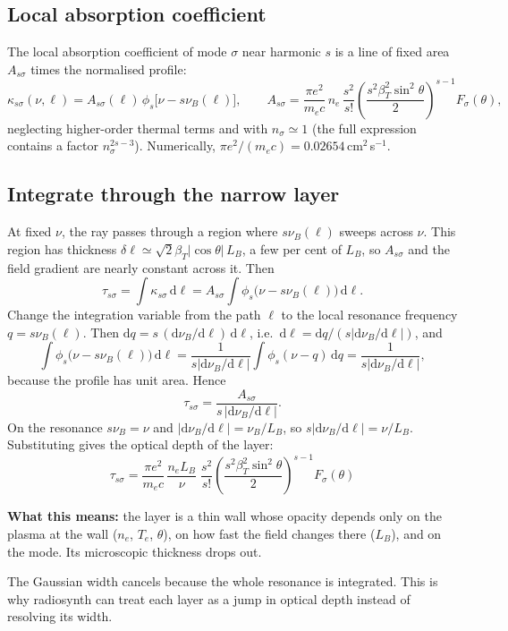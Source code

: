 \documentclass[11pt,a4paper]{article}
\newcommand{\dd}{\mathrm{d}}
\newcommand{\nuB}{\nu_B}
\newcommand{\whatitmeans}[1]{\par{\color{head}\textbf{What this means:}} #1\par}
\begin{document}
\subsection{Local absorption coefficient}
The local absorption coefficient of mode $\sigma$ near harmonic $s$ is a line of fixed area
$A_{s\sigma}$ times the normalised profile:
\begin{equation}
  \kappa_{s\sigma}(\nu,\ell)=A_{s\sigma}(\ell)\,\phi_s\big[\nu-s\nuB(\ell)\big],\qquad
  A_{s\sigma}=\frac{\pi e^2}{m_ec}\,n_e\,\frac{s^2}{s!}\left(\frac{s^2\beta_T^2\sin^2\theta}{2}\right)^{s-1}F_\sigma(\theta),
\end{equation}
neglecting higher-order thermal terms and with $n_\sigma\simeq1$ (the full expression contains a factor
$n_\sigma^{2s-3}$). Numerically, $\pi e^2/(m_ec)=0.02654$\,cm$^2$\,s$^{-1}$.

\subsection{Integrate through the narrow layer}
At fixed $\nu$, the ray passes through a region where $s\nuB(\ell)$ sweeps across $\nu$. This region has
thickness $\delta\ell\simeq\sqrt2\beta_T|\cos\theta|\,L_B$, a few per cent of $L_B$, so $A_{s\sigma}$ and the field
gradient are nearly constant across it. Then
\begin{equation}
  \tau_{s\sigma}=\int\kappa_{s\sigma}\,\dd\ell=A_{s\sigma}\int\phi_s\big(\nu-s\nuB(\ell)\big)\,\dd\ell .
\end{equation}
Change the integration variable from the path $\ell$ to the local resonance frequency
$q=s\nuB(\ell)$. Then $\dd q=s\,(\dd\nuB/\dd\ell)\,\dd\ell$, i.e.\ $\dd\ell=\dd q/(s|\dd\nuB/\dd\ell|)$, and
\begin{equation}
  \int\phi_s\big(\nu-s\nuB(\ell)\big)\,\dd\ell=\frac{1}{s|\dd\nuB/\dd\ell|}\int\phi_s(\nu-q)\,\dd q=\frac{1}{s|\dd\nuB/\dd\ell|},
\end{equation}
because the profile has unit area. Hence
\begin{equation}
  \tau_{s\sigma}=\frac{A_{s\sigma}}{s\,|\dd\nuB/\dd\ell|}.
\end{equation}
On the resonance $s\nuB=\nu$ and $|\dd\nuB/\dd\ell|=\nuB/L_B$, so $s|\dd\nuB/\dd\ell|=\nu/L_B$. Substituting
gives the optical depth of the layer:
\begin{equation}
  \boxed{\;
  \tau_{s\sigma}=\frac{\pi e^2}{m_ec}\,\frac{n_eL_B}{\nu}\;\frac{s^2}{s!}
  \left(\frac{s^2\beta_T^2\sin^2\theta}{2}\right)^{s-1}F_\sigma(\theta)\;}
  \label{eq:tau}
\end{equation}
\whatitmeans{the layer is a thin wall whose opacity depends only on the plasma at the wall ($n_e$, $T_e$,
$\theta$), on how fast the field changes there ($L_B$), and on the mode. Its microscopic thickness drops out.}
The Gaussian width cancels because the whole resonance is integrated. This is why radiosynth can
treat each layer as a jump in optical depth instead of resolving its width.
\end{document}
